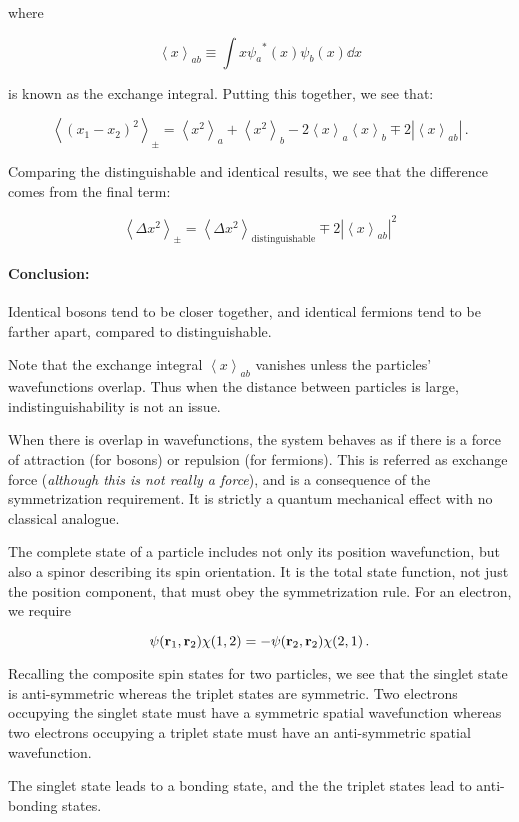 \documentclass[12pt, titlepage]{article}
\newcommand{\exv}[1]{\left\langle #1 \right\rangle}
\begin{document}
where

\begin{equation*}
	\exv{x}_{ab} \equiv \int x {\psi_a}^*(x)\psi_b(x)\dd{x}
\end{equation*}

is known as the exchange integral. Putting this together, we see that:

\begin{equation}
	\exv{(x_1-x_2)^2}_\pm = \exv{x^2}_a + \exv{x^2}_b - 2\exv{x}_a\exv{x}_b \mp 2|\exv{x}_{ab}| \,.
\end{equation}

Comparing the distinguishable and identical results, we see that the difference comes from the final term:

\begin{equation}
	\exv{\Delta x^2}_\pm = \exv{\Delta x^2}_{\text{distinguishable}} \mp 2|\exv{x}_{ab}|^2
\end{equation}

\begin{mdframed}
\paragraph*{Conclusion:}
Identical bosons tend to be closer together, and identical fermions tend to be farther apart, compared to distinguishable.

Note that the exchange integral $\exv{x}_{ab}$ vanishes unless the particles' wavefunctions overlap. Thus when the distance between particles is large, indistinguishability is not an issue.
\end{mdframed}

When there is overlap in wavefunctions, the system behaves as if there is a force of attraction (for bosons) or repulsion (for fermions). This is referred as exchange force (\textit{although this is not really a force}), and is a consequence of the symmetrization requirement. It is strictly a quantum mechanical effect with no classical analogue.

The complete state of a particle includes not only its position wavefunction, but also a spinor describing its spin orientation. It is the total state function, not just the position component, that must obey the symmetrization rule. For an electron, we require

\begin{equation}
	\psi(\vb{r}_1,\vb{r}_2)\chi(1,2) = -\psi(\vb{r}_2,\vb{r}_2)\chi(2,1) \,.
\end{equation}

Recalling the composite spin states for two particles, we see that the singlet state is anti-symmetric whereas the triplet states are symmetric. Two electrons occupying the singlet state must have a symmetric spatial wavefunction whereas two electrons occupying a triplet state must have an anti-symmetric spatial wavefunction.

The singlet state leads to a bonding state, and the the triplet states lead to anti-bonding states.
\end{document}
